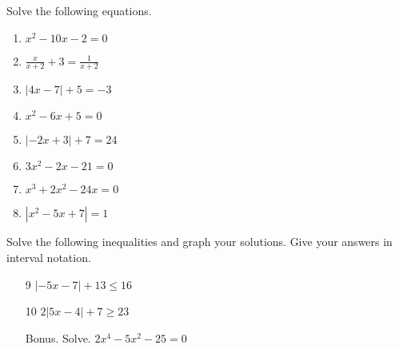 \documentclass{article}
\begin{document}
\TestTitle[class={College Algebra}, name={Test 1}, term={Spring}, date={Sept. 11}, year={2015}, form={A}]

\AlgebraFacts

Solve the following equations.

\begin{enumerate}
\item 

$x^2 - 10x - 2 = 0$

   \vspace{4cm}

\item $\displaystyle\frac{x}{x + 2} + 3 = \displaystyle\frac{1}{x + 2}$ \vspace{4cm}

\item $|4x - 7| + 5 = -3$ \vspace{4cm}

\item $x^2 - 6x + 5 = 0$

   \vspace{4cm}

\newpage

\item $|-2x + 3| + 7 = 24$ \vspace{5cm}

\item $3x^2 - 2x - 21 = 0$

   \vspace{5cm}

\item $x^3 + 2x^2 - 24x = 0$

   \vspace{5cm}

\item $|x^2 - 5x + 7| = 1$

   \vspace{5cm}
\end{enumerate}

\newpage

Solve the following inequalities and graph your solutions. Give your answers in interval notation.

\begin{enumerate}
\item[9] $|-5x - 7| + 13 \leq 16$ \vspace{5cm}

\item[10] $2|5x - 4| + 7 \geq 23$ \vspace{5cm}

\item[Bonus.] Solve. $2x^4 - 5x^2 - 25 = 0$

   \vspace{4cm}
\end{enumerate}
\end{document}
